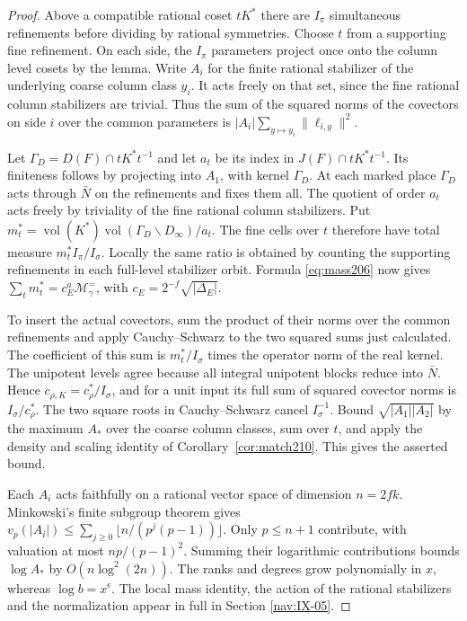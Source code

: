 \documentclass[a4paper,11pt]{article}
\theoremstyle{definition}
\theoremstyle{remark}
\numberwithin{equation}{section}
\begin{document}
\begin{proof}
Above a compatible rational coset \(tK^*\) there are \(I_\pi\)
simultaneous refinements before dividing by rational symmetries.
Choose \(t\) from a supporting fine refinement. On each side,
the \(I_\pi\) parameters project once onto the column level
cosets by the lemma. Write \(A_i\) for the finite rational
stabilizer of the underlying coarse column class \(y_i\).
It acts freely on that set, since the fine rational column
stabilizers are trivial. Thus the sum of the squared norms
of the covectors on side \(i\) over the common parameters is
\(|A_i|\sum_{y\mapsto y_i}\|\ell_{i,y}\|^2\).

Let \(\Gamma_D=D(F)\cap tK^*t^{-1}\) and let \(a_t\) be its
index in \(J(F)\cap tK^*t^{-1}\). Its finiteness follows by
projecting into \(A_1\), with kernel \(\Gamma_D\). At each
marked place \(\Gamma_D\) acts through \(\bar N\) on the
refinements and fixes them all. The quotient of order \(a_t\)
acts freely by triviality of the fine rational column stabilizers.
Put \(m_t^*=\operatorname{vol}(K^*)\operatorname{vol}
(\Gamma_D\backslash D_\infty)/a_t\). The fine cells over \(t\)
therefore have total measure \(m_t^*I_\pi/I_\sigma\).
Locally the same ratio is obtained by counting the supporting
refinements in each full-level stabilizer orbit. Formula
\eqref{eq:mass206} now gives
\(\sum_t m_t^*=c_E^a\mathcal M_\gamma^{=}\), with
\(c_E=2^{-f}\sqrt{|\Delta_E|}\).

To insert the actual covectors, sum the product of their norms
over the common refinements and apply Cauchy--Schwarz to the
two squared sums just calculated. The coefficient of this sum
is \(m_t^*/I_\sigma\) times the operator norm of the real kernel.
The unipotent levels agree because all integral unipotent blocks
reduce into \(\bar N\). Hence \(c_{\rho,K}=c_\rho^*/I_\sigma\),
and for a unit input its full sum of squared covector norms is
\(I_\sigma/c_\rho^*\). The two square roots in Cauchy--Schwarz
cancel \(I_\sigma^{-1}\). Bound \(\sqrt{|A_1||A_2|}\) by the
maximum \(A_*\) over the coarse column classes, sum over \(t\),
and apply the density and scaling identity of
Corollary~\ref{cor:match210}. This gives the asserted bound.

Each \(A_i\) acts faithfully on a rational vector space of
dimension \(n=2fk\). Minkowski's finite subgroup theorem gives
\(v_p(|A_i|)\le\sum_{j\ge0}\lfloor n/(p^j(p-1))\rfloor\).
Only \(p\le n+1\) contribute, with valuation at most
\(np/(p-1)^2\). Summing their logarithmic contributions bounds
\(\log A_*\) by \(O(n\log^2(2n))\). The ranks and degrees grow
polynomially in \(x\), whereas \(\log b=x^\epsilon\).
The local mass identity, the action of the rational stabilizers
and the normalization appear in full in
Section \ref{nav:IX-05}.
\end{proof}
\end{document}
